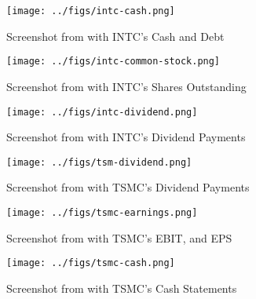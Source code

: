 \begin{figure}[h!]
    \centering
    \texttt{[image: ../figs/intc-cash.png]}
    \caption{Screenshot from \citet{intel_10_k} with INTC's Cash and Debt}
    \label{intc_cash}
\end{figure}

\begin{figure}[h!]
    \centering
    \texttt{[image: ../figs/intc-common-stock.png]}
    \caption{Screenshot from \citet{intel_10_k} with INTC's Shares Outstanding}
    \label{intc_cs}
\end{figure}

\begin{figure}[h!]
    \centering
    \texttt{[image: ../figs/intc-dividend.png]}
    \caption{Screenshot from \citet{nasdaq_intc} with INTC's Dividend Payments}
    \label{intc_dividend}
\end{figure}

\begin{figure}[h!]
    \centering
    \texttt{[image: ../figs/tsm-dividend.png]}
    \caption{Screenshot from \citet{nasdaq_tsm} with TSMC's Dividend Payments}
    \label{tsm_dividend}
\end{figure}

\begin{figure}[h!]
    \centering
    \texttt{[image: ../figs/tsmc-earnings.png]}
    \caption{Screenshot from \citet{tsmc_10_k} with TSMC's EBIT, and EPS}
    \label{tsm_earnings}
\end{figure}

\begin{figure}[h!]
    \centering
    \texttt{[image: ../figs/tsmc-cash.png]}
    \caption{Screenshot from \citet{tsmc_10_k} with TSMC's Cash Statements}
    \label{tsm_cash}
\end{figure}